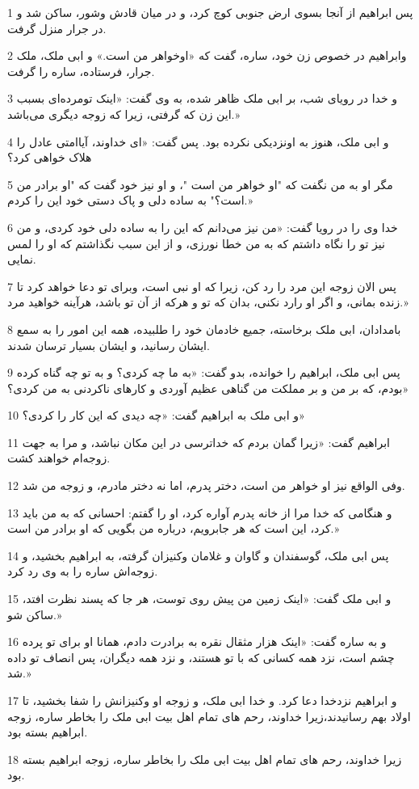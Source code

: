 \par 1 پس ابراهیم از آنجا بسوی ارض جنوبی کوچ کرد، و در میان قادش وشور، ساکن شد و در جرار منزل گرفت.
\par 2 وابراهیم در خصوص زن خود، ساره، گفت که «اوخواهر من است.» و ابی ملک، ملک جرار، فرستاده، ساره را گرفت.
\par 3 و خدا در رویای شب، بر ابی ملک ظاهر شده، به وی گفت: «اینک تومرده‌ای بسبب این زن که گرفتی، زیرا که زوجه دیگری می‌باشد.»
\par 4 و ابی ملک، هنوز به اونزدیکی نکرده بود. پس گفت: «ای خداوند، آیاامتی عادل را هلاک خواهی کرد؟
\par 5 مگر او به من نگفت که "او خواهر من است "، و او نیز خود گفت که "او برادر من است؟" به ساده دلی و پاک دستی خود این را کردم.»
\par 6 خدا وی را در رویا گفت: «من نیز می‌دانم که این را به ساده دلی خود کردی، و من نیز تو را نگاه داشتم که به من خطا نورزی، و از این سبب نگذاشتم که او را لمس نمایی.
\par 7 پس الان زوجه این مرد را رد کن، زیرا که او نبی است، وبرای تو دعا خواهد کرد تا زنده بمانی، و اگر او رارد نکنی، بدان که تو و هر‌که از آن تو باشد، هرآینه خواهید مرد.»
\par 8 بامدادان، ابی ملک برخاسته، جمیع خادمان خود را طلبیده، همه این امور را به سمع ایشان رسانید، و ایشان بسیار ترسان شدند.
\par 9 پس ابی ملک، ابراهیم را خوانده، بدو گفت: «به ما چه کردی؟ و به تو چه گناه کرده بودم، که بر من و بر مملکت من گناهی عظیم آوردی و کارهای ناکردنی به من کردی؟»
\par 10 و ابی ملک به ابراهیم گفت: «چه دیدی که این کار را کردی؟»
\par 11 ابراهیم گفت: «زیرا گمان بردم که خداترسی در این مکان نباشد، و مرا به جهت زوجه‌ام خواهند کشت.
\par 12 وفی الواقع نیز او خواهر من است، دختر پدرم، اما نه دختر مادرم، و زوجه من شد.
\par 13 و هنگامی که خدا مرا از خانه پدرم آواره کرد، او را گفتم: احسانی که به من باید کرد، این است که هر جابرویم، درباره من بگویی که او برادر من است.»
\par 14 پس ابی ملک، گوسفندان و گاوان و غلامان وکنیزان گرفته، به ابراهیم بخشید، و زوجه‌اش ساره را به وی رد کرد.
\par 15 و ابی ملک گفت: «اینک زمین من پیش روی توست، هر جا که پسند نظرت افتد، ساکن شو.»
\par 16 و به ساره گفت: «اینک هزار مثقال نقره به برادرت دادم، همانا او برای تو پرده چشم است، نزد همه کسانی که با تو هستند، و نزد همه دیگران، پس انصاف تو داده شد.»
\par 17 و ابراهیم نزدخدا دعا کرد. و خدا ابی ملک، و زوجه او وکنیزانش را شفا بخشید، تا اولاد بهم رسانیدند،زیرا خداوند، رحم های تمام اهل بیت ابی ملک را بخاطر ساره، زوجه ابراهیم بسته بود.
\par 18 زیرا خداوند، رحم های تمام اهل بیت ابی ملک را بخاطر ساره، زوجه ابراهیم بسته بود.
 

